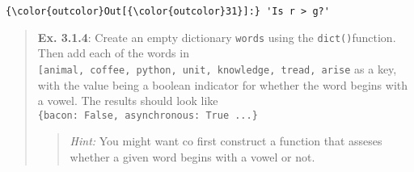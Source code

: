 \documentclass[11pt]{article}
\begin{document}
\begin{Verbatim}[commandchars=\\\{\}]
{\color{outcolor}Out[{\color{outcolor}31}]:} 'Is r > g?'
\end{Verbatim}
            
    \begin{quote}
\textbf{Ex. 3.1.4}: Create an empty dictionary \texttt{words} using the
\texttt{dict()}function. Then add each of the words in
\texttt{{[}\textquotesingle{}animal\textquotesingle{},\ \textquotesingle{}coffee\textquotesingle{},\ \textquotesingle{}python\textquotesingle{},\ \textquotesingle{}unit\textquotesingle{},\ \textquotesingle{}knowledge\textquotesingle{},\ \textquotesingle{}tread\textquotesingle{},\ \textquotesingle{}arise\textquotesingle{}{]}}
as a key, with the value being a boolean indicator for whether the word
begins with a vowel. The results should look like
\texttt{\{\textquotesingle{}bacon\textquotesingle{}:\ False,\ \textquotesingle{}asynchronous\textquotesingle{}:\ True\ ...\}}

\begin{quote}
\emph{Hint:} You might want co first construct a function that asseses
whether a given word begins with a vowel or not.
\end{quote}
\end{quote}
\end{document}
